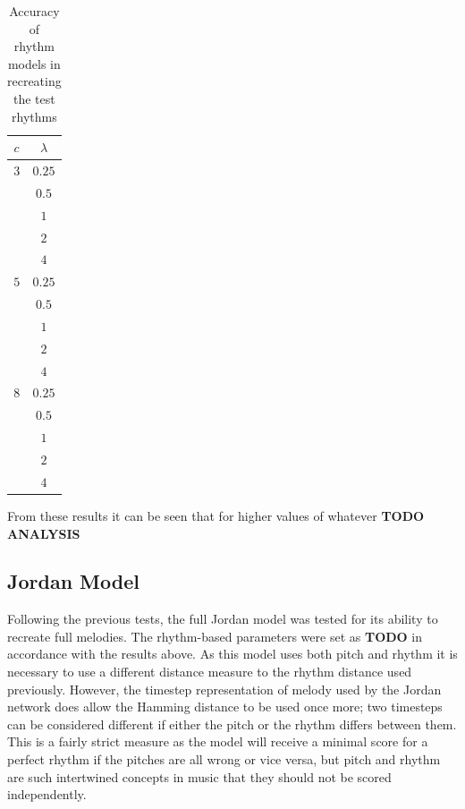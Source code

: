 \documentclass[ author={Stephen Livermore-Tozer},
				supervisor={Dr. Peter Flach},
				degree={MEng},
				title={Algorithmic Co-composition Using Machine Learning},
				subtitle={},
				type={research},
				year={2016} ]{dissertation}
\begin{document}
	\begin{table}[htp]
		\begin{center}
			\begin{tabular}{cc}
				$c$ & $\lambda$\\
				\toprule
				$3$ & $0.25$\\
				& $0.5$\\
				& $1$\\
				& $2$\\
				& $4$\\
				$5$ & $0.25$\\
				& $0.5$\\
				& $1$\\
				& $2$\\
				& $4$\\
				$8$ & $0.25$\\
				& $0.5$\\
				& $1$\\
				& $2$\\
				& $4$\\
				\bottomrule
			\end{tabular}
		\end{center}
		\caption{Accuracy of rhythm models in recreating the test rhythms}
		\label{tab:rhythm-model-results}
	\end{table}
	
	From these results it can be seen that for higher values of whatever \textbf{TODO ANALYSIS}
	
	\subsection{Jordan Model}
	\label{sec:objective-jordan}
	
	Following the previous tests, the full Jordan model was tested for its ability to recreate full melodies. The rhythm-based parameters were set as \textbf{TODO} in accordance with the results above. As this model uses both pitch and rhythm it is necessary to use a different distance measure to the rhythm distance used previously. However, the timestep representation of melody used by the Jordan network does allow the Hamming distance to be used once more; two timesteps can be considered different if either the pitch or the rhythm differs between them. This is a fairly strict measure as the model will receive a minimal score for a perfect rhythm if the pitches are all wrong or vice versa, but pitch and rhythm are such intertwined concepts in music that they should not be scored independently.
	
\end{document}
